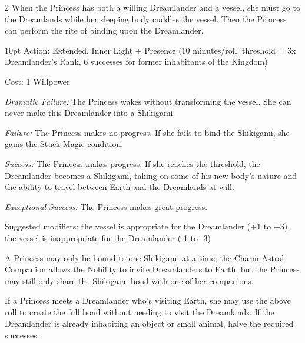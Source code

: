 \begin{multicols}{2}
When the Princess has both a willing Dreamlander and a vessel, she must go to the Dreamlands while her sleeping body cuddles the vessel. Then the Princess can perform the rite of binding upon the Dreamlander.

  \begin{myindentpar}{10pt}  Action: Extended, Inner Light + Presence (10 minutes/roll, threshold = 3x Dreamlander's Rank, 6 successes for former inhabitants of the Kingdom)
  
    Cost: 1 Willpower 
    
    \emph{Dramatic Failure:} The Princess wakes without transforming the vessel. She can never make this Dreamlander into a Shikigami.
    
    \emph{Failure:} The Princess makes no progress. If she fails to bind the Shikigami, she gains the Stuck Magic condition.
    
    \emph{Success:} The Princess makes progress. If she reaches the threshold, the Dreamlander becomes a Shikigami, taking on some of his new body's nature and the ability to travel between Earth and the Dreamlands at will. 
    
    \emph{Exceptional Success:} The Princess makes great progress.
	
    Suggested modifiers: the vessel is appropriate for the Dreamlander (+1 to +3), the vessel is inappropriate for the Dreamlander (-1 to -3) \end{myindentpar}

A Princess may only be bound to one Shikigami at a time; the Charm Astral Companion allows the Nobility to invite Dreamlanders to Earth, but the Princess may still only share the Shikigami bond with one of her companions. 

If a Princess meets a Dreamlander who's visiting Earth, she may use the above roll to create the full bond without needing to visit the Dreamlands. If the Dreamlander is already inhabiting an object or small animal, halve the required successes. 

\end{multicols}
